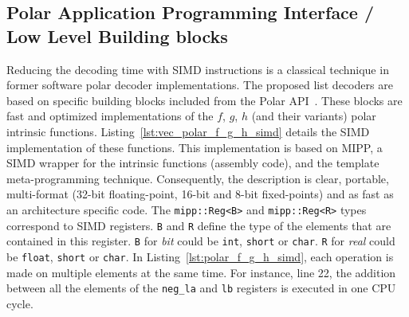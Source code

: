 
\subsection{Polar Application Programming Interface / Low Level Building blocks}
\label{sec:polar_api}



Reducing the decoding time with SIMD instructions is a classical technique in
former software polar decoder implementations. The proposed list decoders are
based on specific building blocks included from the Polar
API~\cite{Cassagne2015c,Cassagne2016b}. These blocks are fast and optimized
implementations of the $f$, $g$, $h$ (and their variants) polar intrinsic
functions. Listing~\ref{lst:vec_polar_f_g_h_simd} details the SIMD
implementation of these  functions. This implementation is based on MIPP, a SIMD
wrapper for the intrinsic functions (assembly code), and the template
meta-programming technique. Consequently, the description is clear, portable,
multi-format (32-bit floating-point, 16-bit and 8-bit fixed-points) and as fast
as an architecture specific code. The \verb|mipp::Reg<B>| and
\verb|mipp::Reg<R>| types correspond to SIMD registers. \verb|B| and \verb|R|
define the type of the elements that are contained in this register. \verb|B|
for \textit{bit} could be \verb|int|, \verb|short| or \verb|char|. \verb|R| for
\textit{real} could be \verb|float|, \verb|short| or \verb|char|. In
Listing~\ref{lst:polar_f_g_h_simd}, each operation is made on multiple elements
at the same  time. For instance, line 22, the addition between all the elements
of the \verb|neg_la| and \verb|lb| registers is executed in one CPU cycle.

